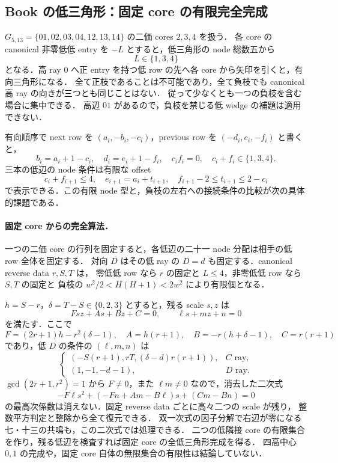 \subsection{Book の低三角形：固定 core の有限完全完成}
\label{nb19:section}

$G_{5,13}=\{01,02,03,04,12,13,14\}$ の二価 cores $2,3,4$ を扱う．
各 core の canonical 非零低低 entry を $-L$ とすると，低三角形の node 総数五から
\[
 L\in\{1,3,4\}
\]
となる．高 ray $0$ へ正 entry を持つ低 row の先へ各 core から矢印を引くと，有向三角形になる．
全て正枝であることは不可能であり，全て負枝でも canonical 高 ray の向きが三つとも同じことはない．
従って少なくとも一つの負枝を含む場合に集中できる．
高辺 $01$ があるので，負枝を禁じる低 wedge の補題は適用できない．

有向順序で next row を $(a_i,-b_i,-c_i)$，previous row を $(-d_i,e_i,-f_i)$ と書くと，
\[
 b_i=a_i+1-c_i,\quad d_i=e_i+1-f_i,\quad c_if_i=0,\quad c_i+f_i\in\{1,3,4\}.
\]
三本の低辺の node 条件は有限な offset
\[
 c_i+f_{i+1}\le4,\quad e_{i+1}=a_i+t_{i+1},\quad
 f_{i+1}-2\le t_{i+1}\le2-c_i
\]
で表示できる．この有限 node 型と，負枝の左右への接続条件の比較が次の具体的課題である．

\paragraph{固定 core からの完全算法．}
一つの二価 core の行列を固定すると，各低辺の二十一 node 分配は相手の低 row 全体を固定する．
対向 $D$ はその低 ray の $D=d$ も固定する．canonical reverse data $r,S,T$ は，
零低低 row なら $r$ の固定と $L\le4$，非零低低 row なら $S,T$ の固定と
負枝の $w^2/2<H(H+1)<2w^2$ により有限個となる．

$h=S-r$，$\delta=T-S\in\{0,2,3\}$ とすると，残る scale $s,z$ は
\[
 Fsz+As+Bz+C=0,\qquad \ell s+mz+n=0
\]
を満たす．ここで
\[
 F=(2r+1)h-r^2(\delta-1),\quad
 A=h(r+1),\quad B=-r(h+\delta-1),\quad C=r(r+1)
\]
であり，低 $D$ の条件の $(\ell,m,n)$ は
\[
 \begin{cases}
 (-S(r+1),rT,(\delta-d)r(r+1)),&C\text{ ray},\\
 (1,-1,-d-1),&D\text{ ray}.
 \end{cases}
\]
$\gcd(2r+1,r^2)=1$ から $F\ne0$，また $\ell m\ne0$ なので，消去した二次式
\[
 -F\ell s^2+(-Fn+Am-B\ell)s+(Cm-Bn)=0
\]
の最高次係数は消えない．固定 reverse data ごとに高々二つの scale が残り，
整数平方判定と整除から全て復元できる．
双一次式の因子分解で右辺が零になる七・十三の共鳴も，この二次式では処理できる．
二つの低隣接 core の有限集合を作り，残る低辺を検査すれば固定 core の全低三角形完成を得る．
四高中心 $0,1$ の完成や，固定 core 自体の無限集合の有限性は結論していない．

